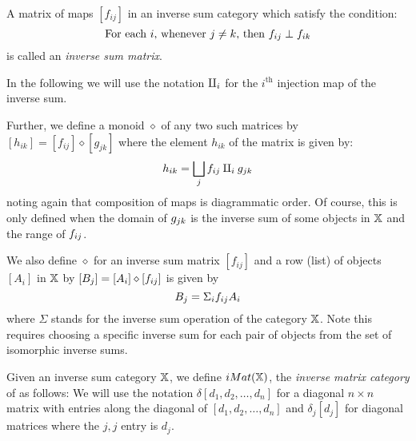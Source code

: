 \begin{definition}\label{def:inverse_sum_matrix}
  A matrix of maps $[f_{i j}]$ in an inverse sum category \X which satisfy the condition:
  \begin{equation}
    \text{For each }i\text{, whenever }j \ne k\text{, then }f_{i j} \perp f_{i k}
    \label{eq:inverse_sum_matrix}
  \end{equation}
  is called an \emph{inverse sum matrix}.

  In the following we will use the notation $\amalg_{i}$ for the $i^{\text{th}}$ injection map of the
  inverse sum.

  Further, we define a monoid $\diamond$ of any two such matrices by
  $[h_{i k}] = [f_{i j}] \diamond [g_{j k}]$ where the element $h_{i k}$ of the matrix is given by:
  \[
    h_{i k} = \bigsqcup_j f_{i j} \amalg_{i} g_{j k}
  \]
  noting again that composition of maps is diagrammatic order. Of course, this is only defined when
  the domain of $g_{j k}$ is the inverse sum of some objects in $\mathbb{X}$ and the range of
  $f_{i j}$.

  We also define $\diamond$ for an inverse sum matrix $[f_{i j}]$ and a row (list) of objects
  $[A_i]$ in $\mathbb{X}$ by $[B_j] = [A_i]\diamond[f_{ij}]$ is given by
  \[
    B_j = \Sigma_i f_{i j} A_i
  \]
  where $\Sigma$ stands for the inverse sum operation of the category $\mathbb{X}$. Note this requires
  choosing a specific inverse sum for each pair of objects from the set of isomorphic inverse sums.
\end{definition}

\begin{definition}\label{def:inverse_matrix_category}
  Given an inverse sum category $\mathbb{X}$, we define $iMat(\mathbb{X})$, the \emph{inverse matrix category} of
  \X as follows:
  We will use the notation $\delta[d_1,d_2,\ldots,d_n]$ for a diagonal $n\times n$ matrix with
  entries along the diagonal of $[d_1,d_2,\ldots,d_n]$ and $\delta_j[d_j]$ for diagonal matrices
  where the $j,j$ entry is $d_j$.
\end{definition}


